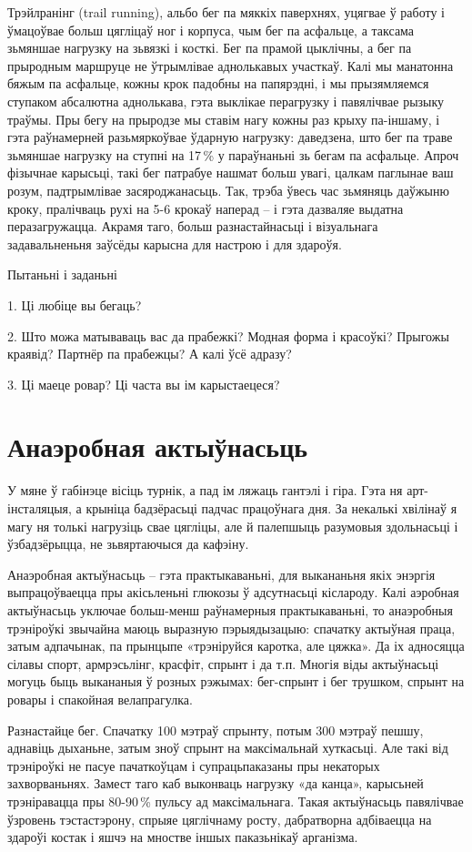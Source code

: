 Трэйлранінг (trail running), альбо бег па мяккіх паверхнях, уцягвае ў работу і ўмацоўвае больш цягліцаў ног і корпуса, чым бег па асфальце, а таксама зьмяншае нагрузку на зьвязкі і косткі. Бег па прамой цыклічны, а бег па прыродным маршруце не ўтрымлівае аднолькавых участкаў. Калі мы манатонна бяжым па асфальце, кожны крок падобны на папярэдні, і мы прызямляемся ступаком абсалютна аднолькава, гэта выклікае перагрузку і павялічвае рызыку траўмы. Пры бегу на прыродзе мы ставім нагу кожны раз крыху па-іншаму, і гэта раўнамерней разьмяркоўвае ўдарную нагрузку: даведзена, што бег па траве зьмяншае нагрузку на ступні на 17\,\% у параўнаньні зь бегам па асфальце. Апроч фізычнае карысьці, такі бег патрабуе нашмат больш увагі, цалкам паглынае ваш розум, падтрымлівае засяроджанасьць. Так, трэба ўвесь час зьмяняць даўжыню кроку, пралічваць рухі на 5-6 крокаў наперад – і гэта дазваляе выдатна перазагружацца. Акрамя таго, больш разнастайнасьці і візуальнага задавальненьня заўсёды карысна для настрою і для здароўя.

Пытаньні і заданьні

1. Ці любіце вы бегаць?

2. Што можа матываваць вас да прабежкі? Модная форма і красоўкі? Прыгожы краявід? Партнёр па прабежцы? А калі ўсё адразу?

3. Ці маеце ровар? Ці часта вы ім карыстаецеся?


\section{Анаэробная актыўнасьць}

У мяне ў габінэце вісіць турнік, а пад ім ляжаць гантэлі і гіра. Гэта ня арт-інсталяцыя, а крыніца бадзёрасьці падчас працоўнага дня. За некалькі хвілінаў я магу ня толькі нагрузіць свае цягліцы, але й палепшыць разумовыя здольнасьці і ўзбадзёрыцца, не зьвяртаючыся да кафэіну.

Анаэробная актыўнасьць – гэта практыкаваньні, для выкананьня якіх энэргія выпрацоўваецца пры акісьленьні глюкозы ў адсутнасьці кіслароду. Калі аэробная актыўнасьць уключае больш-менш раўнамерныя практыкаваньні, то анаэробныя трэніроўкі звычайна маюць выразную пэрыядызацыю: спачатку актыўная праца, затым адпачынак, па прынцыпе «трэніруйся каротка, але цяжка». Да іх адносяцца сілавы спорт, армрэсьлінг, красфіт, спрынт і да т.п. Многія віды актыўнасьці могуць быць выкананыя ў розных рэжымах: бег-спрынт і бег трушком, спрынт на ровары і спакойная велапрагулка.

Разнастайце бег. Спачатку 100 мэтраў спрынту, потым 300 мэтраў пешшу, аднавіць дыханьне, затым зноў спрынт на максімальнай хуткасьці. Але такі від трэніроўкі не пасуе пачаткоўцам і супрацьпаказаны пры некаторых захворваньнях. Замест таго каб выконваць нагрузку «да канца», карысьней трэніравацца пры 80-90\,\% пульсу ад максімальнага. Такая актыўнасьць павялічвае ўзровень тэстастэрону, спрыяе цяглічнаму росту, дабратворна адбіваецца на здароўі костак і яшчэ на мностве іншых паказьнікаў арганізма.

